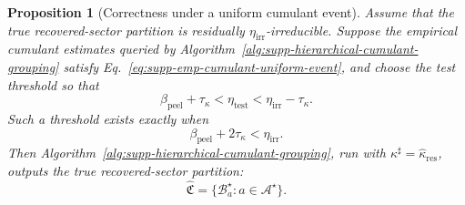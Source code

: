 \documentclass[
  aps,
  prx,
  reprint,
  superscriptaddress,
  amsmath,
  amssymb,
  nofootinbib,
  longbibliography
]{revtex4-2}
\newtheorem{proposition}[theorem]{Proposition}
\begin{document}
\begin{proposition}[Correctness under a uniform cumulant event]
\label{prop:supp-hierarchical-cumulant-correctness}
Assume that the true recovered-sector partition is residually
$\eta_{\mathrm{irr}}$-irreducible.  Suppose the empirical cumulant estimates
queried by Algorithm~\ref{alg:supp-hierarchical-cumulant-grouping} satisfy
Eq.~\eqref{eq:supp-emp-cumulant-uniform-event}, and choose the test threshold so
that
\begin{equation}
\beta_{\mathrm{peel}}+\tau_\kappa
<
\eta_{\mathrm{test}}
<
\eta_{\mathrm{irr}}-\tau_\kappa .
\label{eq:supp-hidden-grouping-threshold-window}
\end{equation}
Such a threshold exists exactly when
\begin{equation}
\beta_{\mathrm{peel}}+2\tau_\kappa
<
\eta_{\mathrm{irr}}.
\end{equation}
Then Algorithm~\ref{alg:supp-hierarchical-cumulant-grouping}, run with
$\kappa^\sharp=\widehat\kappa_{\mathrm{res}}$, outputs the true
recovered-sector partition:
\begin{equation}
\widehat{\mathfrak C}
=
\{\mathcal B_a^\star:a\in\mathcal A^\star\}.
\end{equation}
\end{proposition}
\end{document}
